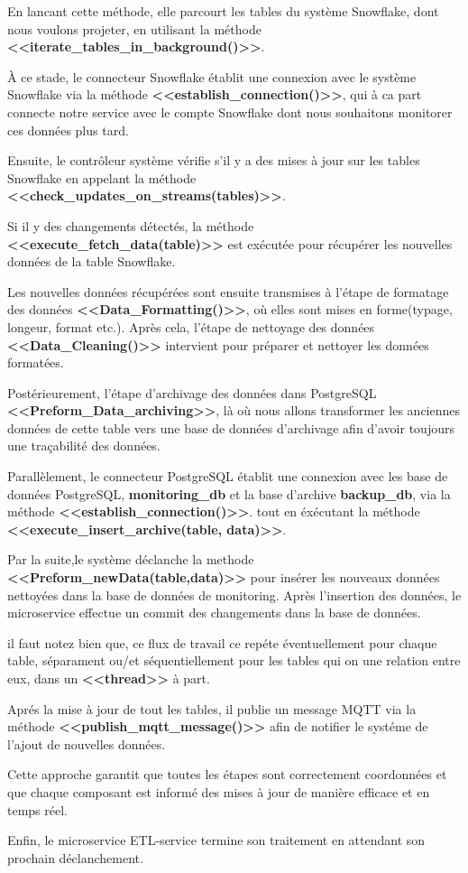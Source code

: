 En lancant cette méthode, elle parcourt les tables du système Snowflake, dont nous voulons projeter, en utilisant la méthode \textbf{<<iterate\_tables\_in\_background()>>}.
\par À ce stade, le connecteur Snowflake établit une connexion avec le système Snowflake via la méthode \textbf{<<establish\_connection()>>}, 
qui à ca part connecte notre service avec le compte Snowflake dont nous souhaitons monitorer ces données plus tard.
\par Ensuite, le contrôleur système vérifie s'il y a des mises à jour sur les tables Snowflake en appelant la méthode \textbf{<<check\_updates\_on\_streams(tables)>>}. 
\par Si il y des changements détectés, la méthode \textbf{<<execute\_fetch\_data(table)>>} est exécutée pour récupérer les nouvelles données de la table Snowflake.
\par Les nouvelles données récupérées sont ensuite transmises à l'étape de formatage des données \newline \textbf{<<Data\_Formatting()>>}, où elles sont mises en forme(typage, longeur, format etc.). 
Après cela, l'étape de nettoyage des données \textbf{<<Data\_Cleaning()>>} intervient pour préparer et nettoyer les données formatées. 
\par Postérieurement, l'étape d'archivage des données dans PostgreSQL \textbf{<<Preform\_Data\_archiving>>}, là où nous allons transformer les anciennes données de cette table vers une base de données d'archivage afin d'avoir toujours une traçabilité des données. 
\par Parallèlement, le connecteur PostgreSQL établit une connexion avec les base de données PostgreSQL, \textbf{monitoring\_db} et la base d'archive \textbf{backup\_db}, via la méthode \textbf{<<establish\_connection()>>}. 
tout en éxécutant la méthode \textbf{<<execute\_insert\_archive(table, data)>>}. 
\par Par la suite,le système déclanche la methode \textbf{<<Preform\_newData(table,data)>>} pour insérer les nouveaux données nettoyées dans la base de données de monitoring. 
Après l'insertion des données, le microservice effectue un commit des changements dans la base de données.
\par il faut notez bien que, ce flux de travail ce repéte éventuellement pour chaque table, séparament ou/et séquentiellement pour les tables qui on une relation entre eux, dans un \textbf{<<thread>>} à part.
\par Aprés la mise à jour de tout les tables, il publie un message MQTT via la méthode \newline \textbf{<<publish\_mqtt\_message()>>} afin de notifier le systéme de l'ajout de nouvelles données. 
\par Cette approche garantit que toutes les étapes sont correctement coordonnées et que chaque composant est informé des mises à jour de manière efficace et en temps réel.
\par Enfin, le microservice ETL-service termine son traitement en attendant son prochain déclanchement.
